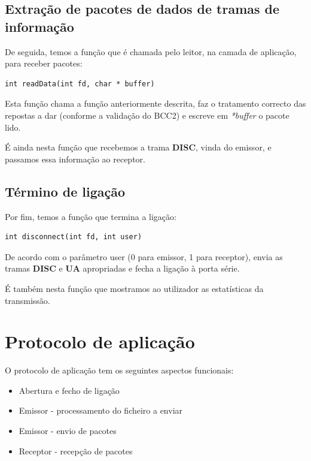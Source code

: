 \documentclass[a4paper,11pt]{article}
\begin{document}
\subsection{Extração de pacotes de dados de tramas de informação}

De seguida, temos a função que é chamada pelo leitor, na camada de aplicação, para receber pacotes:

\begin{lstlisting}
int readData(int fd, char * buffer)
\end{lstlisting}

Esta função chama a função anteriormente descrita, faz o tratamento correcto das repostas a dar (conforme a validação do BCC2) e escreve em \textit{*buffer} o pacote lido.

É ainda nesta função que recebemos a trama \textbf{DISC}, vinda do emissor, e passamos essa informação ao receptor.

\subsection{Término de ligação}

Por fim, temos a função que termina a ligação:

\begin{lstlisting}
int disconnect(int fd, int user)
\end{lstlisting}

De acordo com o parâmetro user (0 para emissor, 1 para receptor), envia as tramas \textbf{DISC} e \textbf{UA} apropriadas e fecha a ligação à porta série.

É também nesta função que mostramos ao utilizador as estatísticas da transmissão.

\section{Protocolo de aplicação}

O protocolo de aplicação tem os seguintes aspectos funcionais:

\begin{itemize}
  \item Abertura e fecho de ligação
  \item Emissor - processamento do ficheiro a enviar
  \item Emissor - envio de pacotes
  \item Receptor - recepção de pacotes
\end{itemize}
\end{document}
